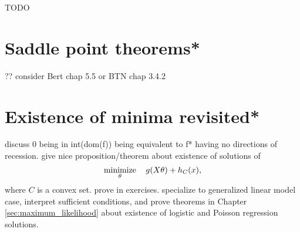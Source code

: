 \begin{Theorem}
\label{thm:slater_conic}
TODO



\end{Theorem}

\section{Saddle point theorems*}
\label{sec:saddle_point_theorems}

?? consider Bert chap 5.5 or BTN chap 3.4.2 

\section{Existence of minima revisited*}
\label{sec:existence_minima_revisited}

discuss 0 being in int(dom(f)) being equivalent to f* having no directions
of recession.  give nice proposition/theorem about existence of solutions of 
$$
\operatorname*{minimize}_\theta \quad g(X \theta) + h_C(x),
$$
where $C$ is a convex set. prove in exercises. specialize to generalized linear
model case, interpret sufficient conditions, and prove theorems in Chapter
\ref{sec:maximum_likelihood} about existence of logistic and Poisson regression
solutions. 

